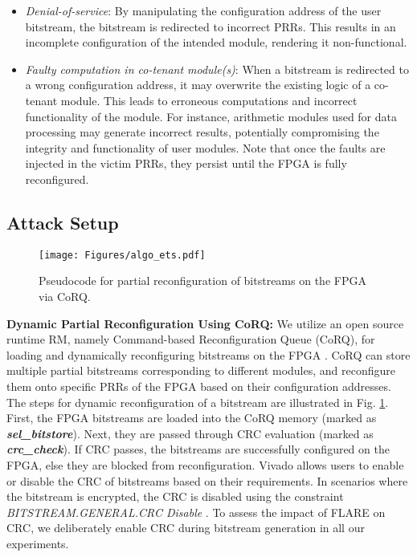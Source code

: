 \begin{itemize}[leftmargin=*,topsep=0pt]
    \item \textit{Denial-of-service}:  By manipulating the configuration address of the user bitstream, the bitstream is redirected to incorrect PRRs. This results in an incomplete configuration of the intended module, rendering it non-functional. 
    \item \textit{Faulty computation in co-tenant module(s)}: When a bitstream is redirected to a wrong configuration address, it may overwrite the existing logic of a co-tenant module. This leads to erroneous computations and incorrect functionality of the module. For instance, arithmetic modules used for data processing may generate incorrect results, potentially compromising the integrity and functionality of user modules. Note that once the faults are injected in the victim PRRs, they persist until the FPGA is fully reconfigured. 
\end{itemize}


\vspace{-0.2cm}

\subsection{Attack Setup}
\vspace{-0.1cm}
\begin{figure}[t]
\texttt{[image: Figures/algo\_ets.pdf]}

\caption{Pseudocode for partial reconfiguration of bitstreams on the FPGA via CoRQ.}\label{alg}

\vspace{-0.6cm}
\end{figure}


\textbf{Dynamic Partial Reconfiguration Using CoRQ:} We utilize an open source runtime RM, namely Command-based Reconfiguration Queue (CoRQ), for loading and dynamically reconfiguring bitstreams on the FPGA \cite{7946114}. CoRQ can store multiple partial bitstreams corresponding to different modules, and reconfigure them onto specific PRRs of the FPGA based on their configuration addresses. The steps for dynamic reconfiguration of a bitstream are illustrated in Fig. \ref{alg}. First, the FPGA bitstreams are loaded into the CoRQ memory (marked as \textbf{\textit{sel\_bitstore}}). Next, they are passed through CRC evaluation (marked as \textbf{\textit{crc\_check}}). If CRC passes, the bitstreams are successfully configured on the FPGA, else they are blocked from reconfiguration.
Vivado allows users to enable or disable the CRC of bitstreams based on their requirements. In scenarios where the bitstream is encrypted, the CRC is disabled using the constraint \textit{BITSTREAM.GENERAL.CRC Disable} \cite{ref_ultra}. To assess the impact of FLARE on CRC, we deliberately enable CRC during bitstream generation in all our experiments.

